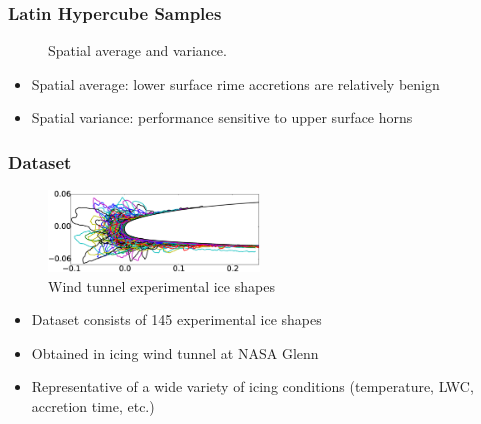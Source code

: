 \documentclass[9pt]{beamer}
\begin{document}
\begin{frame}
\frametitle{Latin Hypercube Samples}
\label{sec-3-12}

\vspace*{-0.0cm}\begin{figure}
      \caption{Spatial average and variance.}
\end{figure}
\begin{itemize}
\item Spatial average: lower surface rime accretions are relatively benign
\item Spatial variance: performance sensitive to upper surface horns
\end{itemize}
\end{frame}
\begin{frame}
\frametitle{Dataset}
\label{sec-3-13}

\vspace*{-0.0cm}\begin{figure}
      \includegraphics[width=0.5\textwidth]{GlobalDataSet}
      \caption{Wind tunnel experimental ice shapes}
\end{figure}
\begin{itemize}
\item Dataset consists of 145 experimental ice shapes
\item Obtained in icing wind tunnel at NASA Glenn\footnotemark[5]
\item Representative of a wide variety of icing conditions (temperature,
  LWC, accretion time, etc.)
\end{itemize}
\end{frame}
\end{document}
